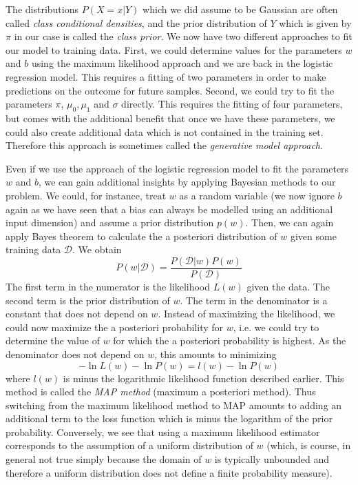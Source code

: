 \documentclass[a4paper, draft]{report}
\numberwithin{section}{chapter}
\numberwithin{equation}{chapter}
\theoremstyle{own}
\theoremstyle{remark}
\begin{document}
The distributions $P(X = x | Y)$ which we did assume to be Gaussian are often called {\em class conditional densities}, and the prior distribution of $Y$ which is given by $\pi$ in our case is called the {\em class prior}. We now have two different approaches to fit our model to training data. First, we could determine values for the parameters $w$ and $b$ using the maximum likelihood approach and we are back in the logistic regression model. This requires a fitting of two parameters in order to make predictions on the outcome for future samples. Second, we could try to fit the parameters $\pi$, $\mu_0, \mu_1$ and $\sigma$ directly. This requires the fitting of four parameters, but comes with the additional benefit that once we have these parameters, we could also create additional data which is not contained in the training set. Therefore this approach is sometimes called the {\em generative model approach}. 

Even if we use the approach of the logistic regression model to fit the parameters $w$ and $b$, we can gain additional insights by applying Bayesian methods to our problem. We could, for instance, treat $w$ as a random variable (we now ignore $b$ again as we have seen that a bias can always be modelled using an additional input dimension) and assume a prior distribution $p(w)$. Then, we can again apply Bayes theorem to calculate the a posteriori distribution of $w$ given some training data $\mathcal D$. We obtain
$$
P(w | {\mathcal D}) = \frac{P({\mathcal D} | w) P(w)}{P({\mathcal D})}
$$
The first term in the numerator is the likelihood $L(w)$ given the data. The second term is the prior distribution of $w$. The term in the denominator is a constant that does not depend on $w$. Instead of maximizing the likelihood, we could now maximize the a posteriori probability for $w$, i.e. we could try to determine the value of $w$ for which the a posteriori probability is highest. As the denominator does not depend on $w$, this amounts to minimizing
$$
- \ln L(w) - \ln P(w) = l(w) - \ln P(w)
$$
where $l(w)$ is minus the logarithmic likelihood function described earlier. This method is called the {\em MAP method} (maximum a posteriori method). Thus switching from the maximum likelihood method to MAP amounts to adding an additional term to the loss function which is minus the logarithm of the prior probability. Conversely, we see that using a maximum likelihood estimator corresponds to the assumption of a uniform distribution of $w$ (which, is course, in general not true simply because the domain of $w$ is typically unbounded and therefore a uniform distribution does not define a finite probability measure).
\end{document}

